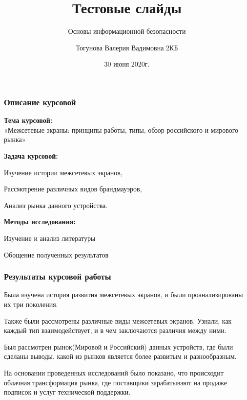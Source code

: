 \documentclass{beamer}
\begin{document}
	\title{Тестовые слайды}
	\subtitle{Основы информационной безопасности}
	\author{Тогунова Валерия Вадимовна 2КБ}
	\date{30 июня 2020г.}
	\begin{frame}
		\maketitle
	\end{frame}

	\begin{frame}
		\frametitle{Описание курсовой}
		\begin{center}
			\textbf{Тема курсовой:}\\
			«Межсетевые экраны: принципы работы, типы, обзор российского и мирового рынка»
		\end{center}
	
		\begin{center}
			\textbf{Задача курсовой:\\}
			\item{Изучение истории межсетевых экранов,}
			\item{Рассмотрение различных видов брандмауэров,}
			\item{Анализ рынка данного устройства.\\}
		\end{center}
		\begin{center}
			\textbf{Методы исследования:\\}
			\item{Изучение и анализ литературы} 
			\item{Обощение полученных результатов}
		\end{center}	
	\end{frame}
	
	\begin{frame}
		\frametitle{Результаты курсовой работы}
		\begin{center}
			\item{Была изучена история развития межсетевых экранов, и были проанализированы их три поколения.}
			\item{Также были рассмотрены различные виды межсетевых экранов. Узнали, как каждый тип взаимодействует, и в чем заключаются различия между ними.}
			\item{Был рассмотрен рынок(Мировой и Российский) данных устройств, где были сделаны выводы, какой из рынков является более развитым и разнообразным.}
			\item{На основании проведенных исследований было показано, что происходит облачная трансформация рынка, где поставщики зарабатывают на продаже подписок и услуг технической поддержки.}
		\end{center}
	\end{frame}
\end{document}
